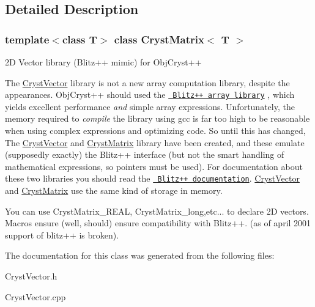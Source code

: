 \subsection{Detailed Description}
\subsubsection*{template$<$class T$>$\newline
class Cryst\+Matrix$<$ T $>$}

2D Vector library (Blitz++ mimic) for Obj\+Cryst++ 

The \mbox{\hyperlink{class_cryst_vector}{Cryst\+Vector}} library is not a new array computation library, despite the appearances. Obj\+Cryst++ should used the \href{http://www.oonumerics.org/blitz/}{\texttt{ Blitz++ array library}} , which yields excellent performance {\itshape and} simple array expressions. Unfortunately, the memory required to {\itshape compile} the library using gcc is far too high to be reasonable when using complex expressions and optimizing code. So until this has changed, The \mbox{\hyperlink{class_cryst_vector}{Cryst\+Vector}} and \mbox{\hyperlink{class_cryst_matrix}{Cryst\+Matrix}} library have been created, and these emulate (supposedly exactly) the Blitz++ interface (but not the smart handling of mathematical expressions, so pointers must be used). For documentation about these two libraries you should read the \href{http://www.oonumerics.org/blitz/manual/}{\texttt{ Blitz++ documentation}}. \mbox{\hyperlink{class_cryst_vector}{Cryst\+Vector}} and \mbox{\hyperlink{class_cryst_matrix}{Cryst\+Matrix}} use the same kind of storage in memory.

You can use Cryst\+Matrix\+\_\+\+R\+E\+AL, Cryst\+Matrix\+\_\+long,etc... to declare 2D vectors. Macros ensure (well, should) ensure compatibility with Blitz++. (as of april 2001 support of blitz++ is broken). 

The documentation for this class was generated from the following files\+:\begin{DoxyCompactItemize}
\item 
Cryst\+Vector.\+h\item 
Cryst\+Vector.\+cpp\end{DoxyCompactItemize}
